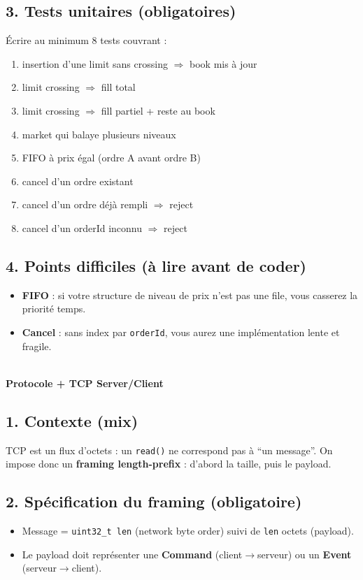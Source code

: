 \documentclass[11pt,a4paper]{article}
\newcommand{\Part}[2]{%
  \vspace{1.0em}
  \noindent{\large\textbf{Part #1}}\\
  \textbf{#2}\\
  \vspace{0.5em}
}
\begin{document}
\subsection*{3. Tests unitaires (obligatoires)}
Écrire au minimum 8 tests couvrant :
\begin{enumerate}
  \item insertion d’une limit sans crossing $\Rightarrow$ book mis à jour
  \item limit crossing $\Rightarrow$ fill total
  \item limit crossing $\Rightarrow$ fill partiel + reste au book
  \item market qui balaye plusieurs niveaux
  \item FIFO à prix égal (ordre A avant ordre B)
  \item cancel d’un ordre existant
  \item cancel d’un ordre déjà rempli $\Rightarrow$ reject
  \item cancel d’un orderId inconnu $\Rightarrow$ reject
\end{enumerate}

\subsection*{4. Points difficiles (à lire avant de coder)}
\begin{itemize}
  \item \textbf{FIFO} : si votre structure de niveau de prix n’est pas une file, vous casserez la priorité temps.
  \item \textbf{Cancel} : sans index par \texttt{orderId}, vous aurez une implémentation lente et fragile.
\end{itemize}

\Part{II}{Protocole + TCP Server/Client}

\subsection*{1. Contexte (mix)}
TCP est un flux d’octets : un \texttt{read()} ne correspond pas à ``un message''.
On impose donc un \textbf{framing length-prefix} : d’abord la taille, puis le payload.

\subsection*{2. Spécification du framing (obligatoire)}
\begin{itemize}
  \item Message = \texttt{uint32\_t len} (network byte order) suivi de \texttt{len} octets (payload).
  \item Le payload doit représenter une \textbf{Command} (client$\to$serveur) ou un \textbf{Event} (serveur$\to$client).
\end{itemize}
\end{document}
